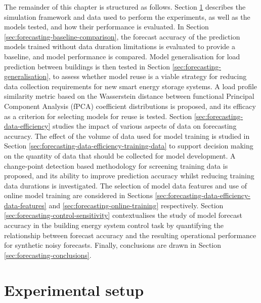 The remainder of this chapter is structured as follows. Section \ref{sec:forecasting-experiment} describes the simulation framework and data used to perform the experiments, as well as the models tested, and how their performance is evaluated. In Section \ref{sec:forecasting-baseline-comparison}, the forecast accuracy of the prediction models trained without data duration limitations is evaluated to provide a baseline, and model performance is compared. Model generalisation for load prediction between buildings is then tested in Section \ref{sec:forecasting-generalisation}, to assess whether model reuse is a viable strategy for reducing data collection requirements for new smart energy storage systems. A load profile similarity metric based on the Wasserstein distance between functional Principal Component Analysis (fPCA) coefficient distributions is proposed, and its efficacy as a criterion for selecting models for reuse is tested. Section \ref{sec:forecasting-data-efficiency} studies the impact of various aspects of data on forecasting accuracy. The effect of the volume of data used for model training is studied in Section \ref{sec:forecasting-data-efficiency-training-data} to support decision making on the quantity of data that should be collected for model development. A change-point detection based methodology for screening training data is proposed, and its ability to improve prediction accuracy whilst reducing training data durations is investigated. The selection of model data features and use of online model training are considered in Sections \ref{sec:forecasting-data-efficiency-data-features} and \ref{sec:forecasting-online-training} respectively. Section \ref{sec:forecasting-control-sensitivity} contextualises the study of model forecast accuracy in the building energy system control task by quantifying the relationship between forecast accuracy and the resulting  operational performance for synthetic noisy forecasts. Finally, conclusions are drawn in Section \ref{sec:forecasting-conclusions}.


\newpage
\section{Experimental setup} \label{sec:forecasting-experiment}


